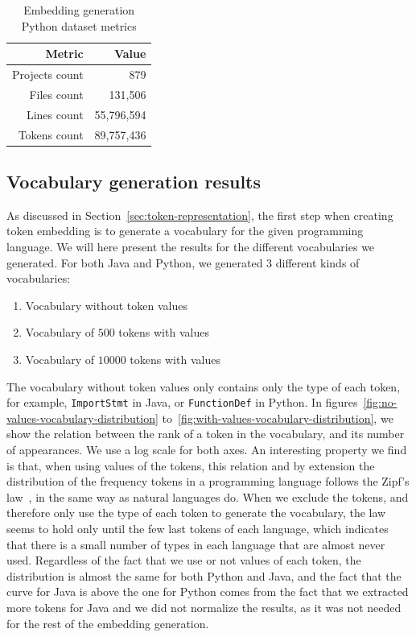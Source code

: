\begin{table}
  \caption{\label{tab:python-embedding-dataset}Embedding generation Python
    dataset metrics}
  \begin{center}
    \begin{tabular}{r r}
      \toprule
      Metric & Value\\
      \toprule
      Projects count & 879\\
      Files count & 131,506\\
      Lines count & 55,796,594\\
      Tokens count & 89,757,436\\
      \bottomrule
    \end{tabular}
  \end{center}
\end{table}

\subsection{Vocabulary generation results}
As discussed in Section~\ref{sec:token-representation}, the first step when
creating token embedding is to generate a vocabulary for the given programming
language. We will here present the results for the different vocabularies we
generated. For both Java and Python, we generated 3 different kinds of
vocabularies:

\begin{enumerate}
\item Vocabulary without token values
\item Vocabulary of $500$ tokens with values
\item Vocabulary of $10000$ tokens with values
\end{enumerate}

The vocabulary without token values only contains only the type of each token,
for example, \lstinline{ImportStmt} in Java, or \lstinline{FunctionDef} in
Python. In figures~\ref{fig:no-values-vocabulary-distribution}
to~\ref{fig:with-values-vocabulary-distribution}, we show the relation between
the rank of a token in the vocabulary, and its number of appearances. We use a
log scale for both axes. An interesting property we find is that, when using
values of the tokens, this relation and by extension the distribution of the
frequency tokens in a programming language follows the Zipf's
law~\cite{piantadosi2013zipf}, in the same way as natural languages do.
When we exclude the tokens, and therefore only use the type of each token to
generate the vocabulary, the law seems to hold only until the few last tokens of
each language, which indicates that there is a small number of types in each
language that are almost never used. Regardless of the fact that we use or not
values of each token, the distribution is almost the same for both Python and
Java, and the fact that the curve for Java is above the one for Python comes
from the fact that we extracted more tokens for Java and we did not normalize
the results, as it was not needed for the rest of the embedding generation.

